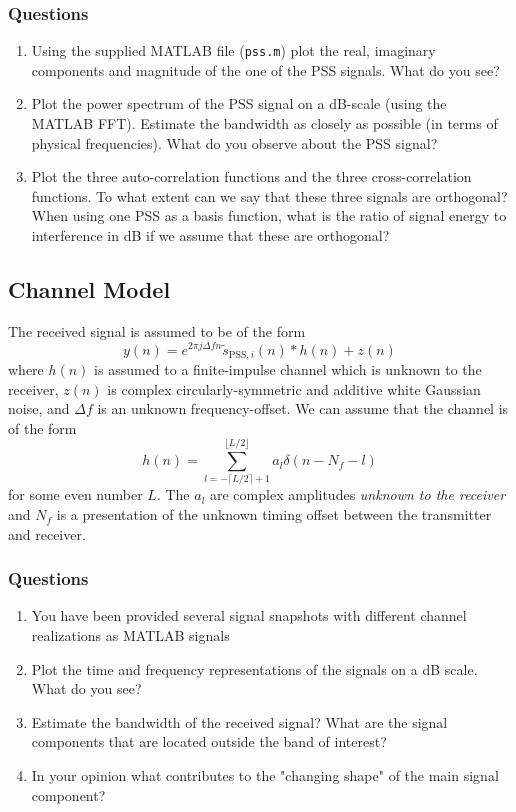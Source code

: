 \documentclass[a4paper,10pt]{article}
\begin{document}
\subsubsection{Questions}
\begin{enumerate}
\item Using the supplied MATLAB file ({\tt pss.m}) plot the real, imaginary components and magnitude of the one of the PSS signals.  What do you see?
\item Plot the power spectrum of the PSS signal on a dB-scale (using the MATLAB FFT).  Estimate the bandwidth as closely as possible (in terms of physical frequencies).  What do you observe about the PSS signal?
\item Plot the three auto-correlation functions and the three cross-correlation functions.  To what extent can we say that these three signals are orthogonal?  When using one PSS as a basis function, what is the ratio of signal energy to interference in dB if we assume that these are orthogonal? 
\end{enumerate}
\subsection{Channel Model}
The received signal is assumed to be of the form
\begin{equation*}
y(n) = e^{2\pi j \Delta fn}\tilde{s}_{\mathrm{PSS},i}(n)*h(n) + z(n)
\end{equation*}
where $h(n)$ is assumed to a finite-impulse channel which is unknown to the receiver, $z(n)$ is complex circularly-symmetric and additive white Gaussian noise, and $\Delta f$ is an unknown frequency-offset.
We can assume that the channel is of the form
\begin{equation*}
h(n) = \sum_{l=-\lceil L/2\rceil+1}^{\lfloor L/2\rfloor}a_l\delta(n-N_f-l) 
\end{equation*}
for some even number $L$.  The $a_l$ are complex amplitudes {\em unknown to the receiver} and $N_f$ is a presentation of the unknown timing offset between the transmitter and receiver.
\subsubsection{Questions}
\begin{enumerate}
\item You have been provided several signal snapshots with different channel realizations as MATLAB signals
\item Plot the time and frequency representations of the signals on a dB scale. What do you see?
\item Estimate the bandwidth of the received signal? What are the signal components that are located outside the band of interest?
\item In your opinion what contributes to the "changing shape" of the main signal component?
\end{enumerate}
\end{document}
